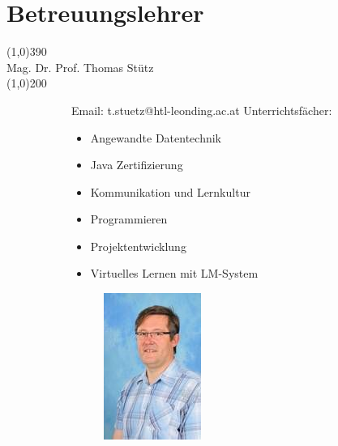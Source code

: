 \documentclass[FIPLY_base.tex]{subfiles}
\begin{document}
	\section{Betreuungslehrer}
	\line(1,0){390}
	\ \\
	\newline\newline
	{\Large Mag. Dr. Prof. Thomas Stütz}
	\ \\
	\line(1,0){200}
	\begin{figure}[H]
		\begin{subfigure}[b]{0.6\textwidth}
			Email: t.stuetz@htl-leonding.ac.at
			\newline
			\newline
			Unterrichtsfächer:
			\begin{itemize}
				\item Angewandte Datentechnik 
				\item Java Zertifizierung 
				\item Kommunikation und Lernkultur 
				\item Programmieren 
				\item Projektentwicklung 
				\item Virtuelles Lernen mit LM-System
			\end{itemize}
		\end{subfigure}
		\begin{subfigure}[b]{0.6\textwidth}
			\begin{subfigure}[b]{0.2\textwidth}
				\includegraphics[scale=0.9]{img/stuetz}
			\end{subfigure}
		\end{subfigure}
	\end{figure}
\end{document}

